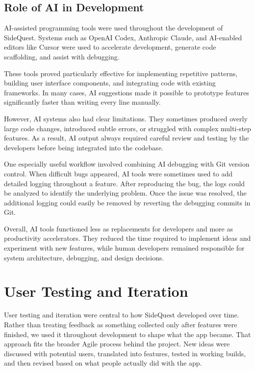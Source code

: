 \documentclass[12pt,a4paper,oneside]{report}
\begin{document}
\section{Role of AI in Development}

AI-assisted programming tools were used throughout the development of SideQuest. Systems such as OpenAI Codex, Anthropic Claude, and AI-enabled editors like Cursor were used to accelerate development, generate code scaffolding, and assist with debugging.

These tools proved particularly effective for implementing repetitive patterns, building user interface components, and integrating code with existing frameworks. In many cases, AI suggestions made it possible to prototype features significantly faster than writing every line manually.

However, AI systems also had clear limitations. They sometimes produced overly large code changes, introduced subtle errors, or struggled with complex multi-step features. As a result, AI output always required careful review and testing by the developers before being integrated into the codebase.

One especially useful workflow involved combining AI debugging with Git version control. When difficult bugs appeared, AI tools were sometimes used to add detailed logging throughout a feature. After reproducing the bug, the logs could be analyzed to identify the underlying problem. Once the issue was resolved, the additional logging could easily be removed by reverting the debugging commits in Git.

Overall, AI tools functioned less as replacements for developers and more as productivity accelerators. They reduced the time required to implement ideas and experiment with new features, while human developers remained responsible for system architecture, debugging, and design decisions.

%
\chapter{User Testing and Iteration}
\label{ch:testing}

User testing and iteration were central to how SideQuest developed over time. Rather than treating feedback as something collected only after features were finished, we used it throughout development to shape what the app became. That approach fits the broader Agile process behind the project. New ideas were discussed with potential users, translated into features, tested in working builds, and then revised based on what people actually did with the app.
\end{document}
